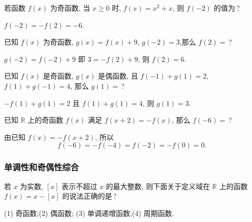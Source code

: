   \lianxi
  \begin{exercise}
    若函数 $f(x)$ 为奇函数, 当 $x\geqslant 0$ 时, $f(x)=x^2+x$,
    则 $f(-2)$ 的值为\,?
  \end{exercise}

  \beginsolution
    $f(-2)=-f(2)=-6$.
  \endsolution
  
  \begin{exercise}
    已知 $f(x)$ 为奇函数, $g(x)=f(x)+9$, $g(-2)=3$,那么 $f(2)=$\,?
  \end{exercise}

  \beginsolution
    $g(-2)=f(-2)+9$ 即 $3=-f(2)+9$, 则 $f(2)=6$.
  \endsolution
  
  \begin{exercise}
    已知 $f(x)$ 是奇函数, $g(x)$ 是偶函数, 且 $f(-1)+g(1)=2$, 
    $f(1)+g(-1)=4$, 那么 $g(1)=$\,?
  \end{exercise}

  \beginsolution
    $-f(1)+g(1)=2$ 且 $f(1)+g(1)=4$, 则 $g(1)=3$.
  \endsolution
  
  \begin{exercise}
    已知 $\mathbb{R}$ 上的奇函数 $f(x)$ 满足 $f(x+2)=-f(x)$,
    那么 $f(-6)=$\,?
  \end{exercise}

  \beginsolution
    由已知 $f(x)=-f(x+2)$, 所以 
    \[f(-6)=-f(-4)=f(-2)=-f(0)=0.\]
  \endsolution
  
  \subsubsection{单调性和奇偶性综合}
  \begin{example}
    若 $x$ 为实数, $[x]$ 表示不超过 $x$ 的最大整数, 
    则下面关于定义域在 $\mathbb{R}$ 上的函数 $f(x)=x-[x]$ 的说法正确的是\,?
    
    (1) 奇函数;\qquad (2) 偶函数;\qquad 
    (3) 单调递增函数;\qquad (4) 周期函数.
  \end{example}

